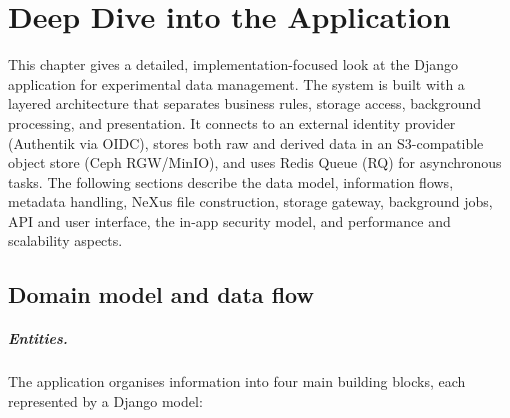\chapter{Deep Dive into the Application}\label{chap:deep-dive-app}

This chapter gives a detailed, implementation-focused look at the Django application for experimental data management. 
The system is built with a layered architecture that separates business rules, storage access, background processing, and presentation. 
It connects to an external identity provider (Authentik via OIDC), stores both raw and derived data in an S3-compatible object store (Ceph RGW/MinIO), 
and uses Redis Queue (RQ) for asynchronous tasks.
The following sections describe the data model, information flows, metadata handling, NeXus file construction, storage gateway, 
background jobs, API and user interface, the in-app security model, and performance and scalability aspects.


\section{Domain model and data flow}\label{sec:domain-dataflow}

\paragraph{Entities.}
The application organises information into four main building blocks, each represented by a Django model:

